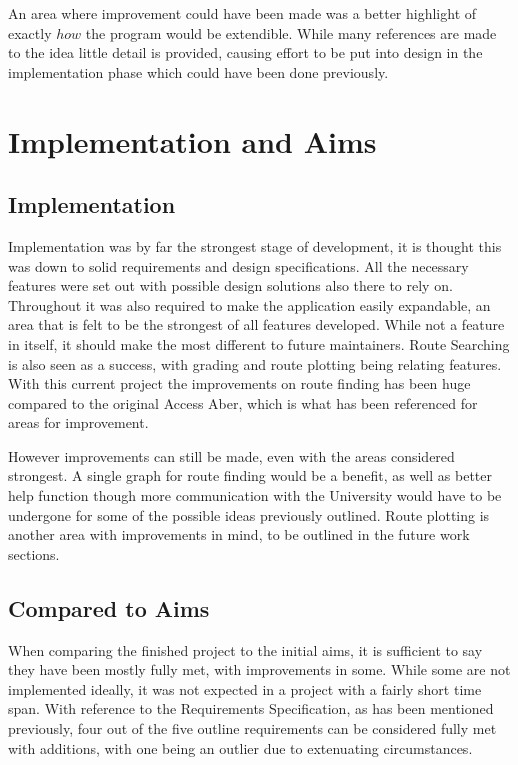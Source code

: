 An area where improvement could have been made was a better highlight of exactly $how$ the program would be extendible. While many references are made to the idea little detail is provided, causing effort to be put into design in the implementation phase which could have been done previously. 
\section{Implementation and Aims}
\subsection{Implementation}
Implementation was by far the strongest stage of development, it is thought this was down to solid requirements and design specifications. All the necessary features were set out with possible design solutions also there to rely on. Throughout it was also required to make the application easily expandable, an area that is felt to be the strongest of all features developed. While not a feature in itself, it should make the most different to future maintainers. Route Searching is also seen as a success, with grading and route plotting being relating features. With this current project the improvements on route finding has been huge compared to the original Access Aber, which is what has been referenced for areas for improvement. 

However improvements can still be made, even with the areas considered strongest. A single graph for route finding would be a benefit, as well as better help function though more communication with the University would have to be undergone for some of the possible ideas previously outlined. Route plotting is another area with improvements in mind, to be outlined in the future work sections. 
\subsection{Compared to Aims}
When comparing the finished project to the initial aims, it is sufficient to say they have been mostly fully met, with improvements in some. While some are not implemented ideally, it was not expected in a project with a fairly short time span. With reference to the Requirements Specification, as has been mentioned previously, four out of the five outline requirements can be considered fully met with additions, with one being an outlier due to extenuating circumstances. 

